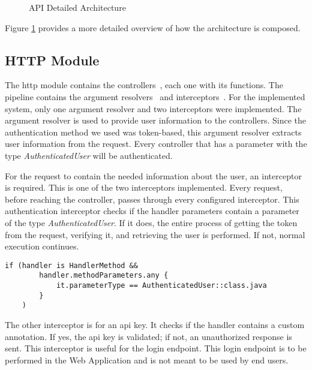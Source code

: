 \vspace{3mm}

\begin{figure}[H]
    \centering
    
    \caption{API Detailed Architecture}
    \label{fig:api_detailed_architecture}
\end{figure}

Figure \ref{fig:api_detailed_architecture} provides a more detailed overview of how the architecture is composed. 

\subsection*{HTTP Module}
The \acs{http} module contains the controllers~\cite{controller}, each one with its functions. The pipeline contains the argument resolvers~\cite{argument-resolver} and interceptors~\cite{interceptor}. For the implemented system, only one argument resolver and two interceptors were implemented. The argument resolver is used to provide user information to the controllers. Since the authentication method we used was token-based, this argument resolver extracts user information from the request. Every controller that has a parameter with the type \textit{AuthenticatedUser} will be authenticated. 

For the request to contain the needed information about the user, an interceptor is required. This is one of the two interceptors implemented. Every request, before reaching the controller, passes through every configured interceptor. This authentication interceptor checks if the handler parameters contain a parameter of the type \textit{AuthenticatedUser}. If it does, the entire process of getting the token from the request, verifying it, and retrieving the user is performed. If not, normal execution continues.
\begin{center}
    \begin{lstlisting}[caption={Type AuthenticatedUser verification example}]
    if (handler is HandlerMethod &&
        handler.methodParameters.any {
            it.parameterType == AuthenticatedUser::class.java
        }
    )
    \end{lstlisting}
\end{center}

The other interceptor is for an \acs{api} key. It checks if the handler contains a custom annotation. If yes, the \acs{api} key is validated; if not, an unauthorized response is sent. This interceptor is useful for the login endpoint. This login endpoint is to be performed in the Web Application and is not meant to be used by end users.

